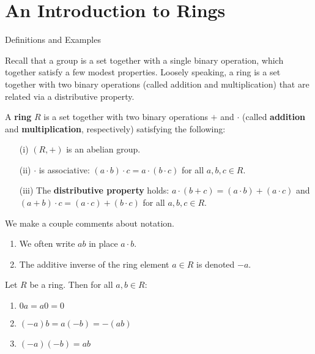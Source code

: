 \chapter{An Introduction to Rings}
\label{chapter:rings}
\thispagestyle{empty}

\begin{section}{Definitions and Examples}

Recall that a group is a set together with a single binary operation, which together satisfy a few modest properties. Loosely speaking, a ring is a set together with two binary operations (called addition and multiplication) that are related via a distributive property.

\begin{definition}
A \textbf{ring} $R$ is a set together with two binary operations $+$ and $\cdot$ (called \textbf{addition} and \textbf{multiplication}, respectively) satisfying the following:
\begin{enumerate}
\item[(i)] $(R,+)$ is an abelian group.
\item[(ii)] $\cdot$ is associative: $(a\cdot b)\cdot c=a\cdot (b\cdot c)$ for all $a,b,c\in R$.
\item[(iii)] The \textbf{distributive property} holds: $a\cdot (b+c)=(a\cdot b)+(a\cdot c)$ and $(a+b)\cdot c = (a\cdot c)+(b\cdot c)$ for all $a,b,c\in R$.
\end{enumerate}
\end{definition}

\begin{remark}
We make a couple comments about notation.
\begin{enumerate}[label=\rm{(\alph*)}]
\item We often write $ab$ in place $a\cdot b$.
\item The additive inverse of the ring element $a\in R$ is denoted $-a$.
\end{enumerate}
\end{remark}

\begin{theorem}
Let $R$ be a ring.  Then for all $a,b\in R$:
\begin{enumerate}[label=\rm{(\alph*)}]
\item $0a=a0=0$
\item $(-a)b=a(-b)=-(ab)$
\item $(-a)(-b)=ab$
\end{enumerate}
\end{theorem}


\end{section}
